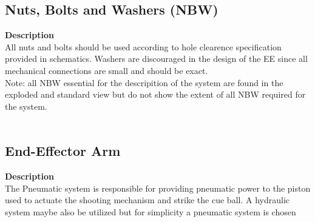 \documentclass[titlepage]{article}
\begin{document}
\begin{center}
\begin{center}
\begin{center}
\begin{center}
\begin{center}
\begin{center}
\begin{center}
\begin{center}
\begin{center}
\begin{center}
\begin{center}
\begin{center}
\begin{center}
\begin{center}

\subsection{Nuts, Bolts and Washers (NBW)}
\textbf{Description}\\
All nuts and bolts should be used according to hole clearence specification provided in schematics. Washers are discouraged in the design of the EE since all mechanical connections are small and should be exact. \\Note: all NBW essential for the descripition of the system are found in the exploded and standard view but do not show the extent of all NBW required for the system.\\\\





\newpage
\subsection{End-Effector Arm}
\textbf{Description}\\
The Pneumatic system is responsible for providing pneumatic power to the piston used to actuate the shooting mechanism and strike the cue ball. A hydraulic system maybe also be utilized but for simplicity a pneumatic system is chosen\\\\
\end{center}

\newpage

\end{center}
\end{center}
\end{center}
\end{center}
\end{center}
\end{center}
\end{center}
\end{center}
\end{center}
\end{center}
\end{center}
\end{center}
\end{center}
\end{document}
